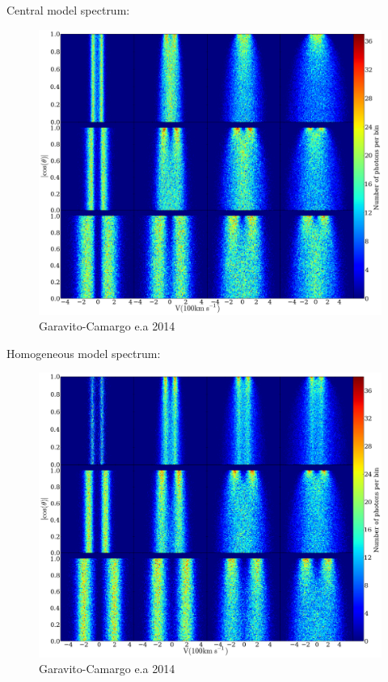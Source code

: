 \documentclass{beamer}
\begin{document}
\begin{frame}{Central model spectrum:}
\begin{figure}
\includegraphics[scale=0.18]{Figures/f2.png}
\caption*{Garavito-Camargo e.a 2014}
\end{figure}
\end{frame}

\begin{frame}{Homogeneous model spectrum:}
\begin{figure}
\includegraphics[scale=0.18]{Figures/f3.png}
\caption*{Garavito-Camargo e.a 2014}
\end{figure}
\end{frame}
\end{document}
